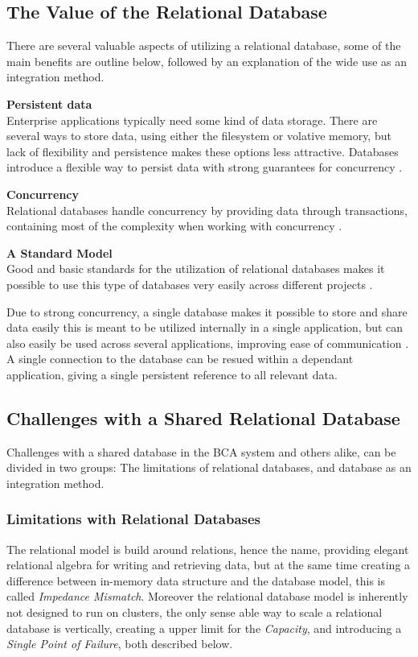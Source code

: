 \subsection{The Value of the Relational Database}
There are several valuable aspects of utilizing a relational database, some of the main benefits are outline below, followed by an explanation of the wide use as an integration method.

\textbf{Persistent data}\\
Enterprise applications typically need some kind of data storage. There are several ways to store data, using either the filesystem or volative memory, but lack of flexibility and persistence makes these options less attractive. Databases introduce a flexible way to persist data with strong guarantees for concurrency \cite[p.~3]{sadalage2012nosql}.

\textbf{Concurrency}\\
Relational databases handle concurrency by providing data through transactions, containing most of the complexity when working with concurrency \cite[p.~4]{sadalage2012nosql}. 

\textbf{A Standard Model}\\
Good and basic standards for the utilization of relational databases makes it possible to use this type of databases very easily across different projects \cite[p.~4]{sadalage2012nosql}. 



Due to strong concurrency, a single database makes it possible to store and share data easily this is meant to be utilized internally in a single application, but can also easily be used across several applications, improving ease of communication \cite[p.~4]{sadalage2012nosql}. A single connection to the database can be resued within a dependant application, giving a single persistent reference to all relevant data.

\subsection{Challenges with a Shared Relational Database}
Challenges with a shared database in the BCA system and others alike, can be divided in two groups: The limitations of relational databases, and database as an integration method.

\subsubsection{Limitations with Relational Databases}
The relational model is build around relations, hence the name, providing elegant relational algebra for writing and retrieving data, but at the same time creating a difference between in-memory data structure and the database model, this is called \textit{Impedance Mismatch}. Moreover the relational database model is inherently not designed to run on clusters, the only sense able way to scale a relational database is vertically, creating a upper limit for the \textit{Capacity}, and introducing a \textit{Single Point of Failure}, both described below.


